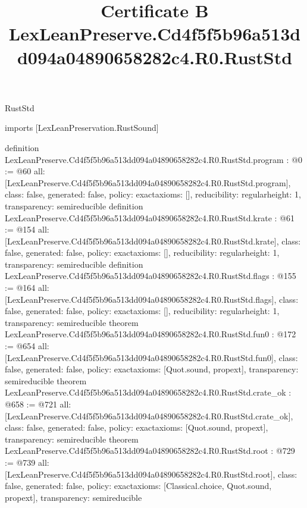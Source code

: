 \begin{lexlean}{RustStd}
\title{Certificate B LexLeanPreserve.Cd4f5f5b96a513dd094a04890658282c4.R0.RustStd}
\begin{coremodule}
imports [LexLeanPreservation.RustSound]

definition LexLeanPreserve.Cd4f5f5b96a513dd094a04890658282c4.R0.RustStd.program : @0 := @60 {
  all: [LexLeanPreserve.Cd4f5f5b96a513dd094a04890658282c4.R0.RustStd.program],
  class: false,
  generated: false,
  policy: exact{axioms: []},
  reducibility: regular{height: 1},
  transparency: semireducible
}
definition LexLeanPreserve.Cd4f5f5b96a513dd094a04890658282c4.R0.RustStd.krate : @61 := @154 {
  all: [LexLeanPreserve.Cd4f5f5b96a513dd094a04890658282c4.R0.RustStd.krate],
  class: false,
  generated: false,
  policy: exact{axioms: []},
  reducibility: regular{height: 1},
  transparency: semireducible
}
definition LexLeanPreserve.Cd4f5f5b96a513dd094a04890658282c4.R0.RustStd.flags : @155 := @164 {
  all: [LexLeanPreserve.Cd4f5f5b96a513dd094a04890658282c4.R0.RustStd.flags],
  class: false,
  generated: false,
  policy: exact{axioms: []},
  reducibility: regular{height: 1},
  transparency: semireducible
}
theorem LexLeanPreserve.Cd4f5f5b96a513dd094a04890658282c4.R0.RustStd.fun0 : @172 := @654 {
  all: [LexLeanPreserve.Cd4f5f5b96a513dd094a04890658282c4.R0.RustStd.fun0],
  class: false,
  generated: false,
  policy: exact{axioms: [Quot.sound, propext]},
  transparency: semireducible
}
theorem LexLeanPreserve.Cd4f5f5b96a513dd094a04890658282c4.R0.RustStd.crate_ok : @658 := @721 {
  all: [LexLeanPreserve.Cd4f5f5b96a513dd094a04890658282c4.R0.RustStd.crate_ok],
  class: false,
  generated: false,
  policy: exact{axioms: [Quot.sound, propext]},
  transparency: semireducible
}
theorem LexLeanPreserve.Cd4f5f5b96a513dd094a04890658282c4.R0.RustStd.root : @729 := @739 {
  all: [LexLeanPreserve.Cd4f5f5b96a513dd094a04890658282c4.R0.RustStd.root],
  class: false,
  generated: false,
  policy: exact{axioms: [Classical.choice, Quot.sound, propext]},
  transparency: semireducible
}


\end{coremodule}
\end{lexlean}
